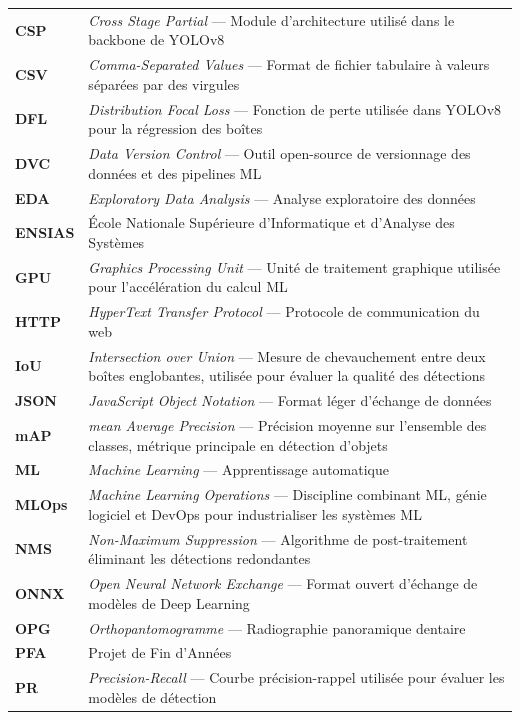 \documentclass{rapportENSIAS}
\begin{document}
\begin{table}[H]
\begin{tabular}{p{3.5cm} p{11cm}}
\textbf{CSP}      & \textit{Cross Stage Partial} --- Module d'architecture utilisé dans le backbone de YOLOv8 \\
\textbf{CSV}      & \textit{Comma-Separated Values} --- Format de fichier tabulaire à valeurs séparées par des virgules \\
\textbf{DFL}      & \textit{Distribution Focal Loss} --- Fonction de perte utilisée dans YOLOv8 pour la régression des boîtes \\
\textbf{DVC}      & \textit{Data Version Control} --- Outil open-source de versionnage des données et des pipelines ML \\
\textbf{EDA}      & \textit{Exploratory Data Analysis} --- Analyse exploratoire des données \\
\textbf{ENSIAS}   & École Nationale Supérieure d'Informatique et d'Analyse des Systèmes \\
\textbf{GPU}      & \textit{Graphics Processing Unit} --- Unité de traitement graphique utilisée pour l'accélération du calcul ML \\
\textbf{HTTP}     & \textit{HyperText Transfer Protocol} --- Protocole de communication du web \\
\textbf{IoU}      & \textit{Intersection over Union} --- Mesure de chevauchement entre deux boîtes englobantes, utilisée pour évaluer la qualité des détections \\
\textbf{JSON}     & \textit{JavaScript Object Notation} --- Format léger d'échange de données \\
\textbf{mAP}      & \textit{mean Average Precision} --- Précision moyenne sur l'ensemble des classes, métrique principale en détection d'objets \\
\textbf{ML}       & \textit{Machine Learning} --- Apprentissage automatique \\
\textbf{MLOps}    & \textit{Machine Learning Operations} --- Discipline combinant ML, génie logiciel et DevOps pour industrialiser les systèmes ML \\
\textbf{NMS}      & \textit{Non-Maximum Suppression} --- Algorithme de post-traitement éliminant les détections redondantes \\
\textbf{ONNX}     & \textit{Open Neural Network Exchange} --- Format ouvert d'échange de modèles de Deep Learning \\
\textbf{OPG}      & \textit{Orthopantomogramme} --- Radiographie panoramique dentaire \\
\textbf{PFA}      & Projet de Fin d'Années \\
\textbf{PR}       & \textit{Precision-Recall} --- Courbe précision-rappel utilisée pour évaluer les modèles de détection \\

\end{tabular}
\end{table}
\end{document}
